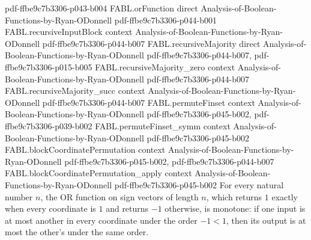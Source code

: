 \begin{theorem}
  {pdf-ffbe9c7b3306-p043-b004}
\proofstep
  {FABL.orFunction}
  {direct}
  {Analysis-of-Boolean-Functions-by-Ryan-ODonnell}
  {pdf-ffbe9c7b3306-p044-b001}
\proofstep
  {FABL.recursiveInputBlock}
  {context}
  {Analysis-of-Boolean-Functions-by-Ryan-ODonnell}
  {pdf-ffbe9c7b3306-p044-b007}
\proofstep
  {FABL.recursiveMajority}
  {direct}
  {Analysis-of-Boolean-Functions-by-Ryan-ODonnell}
  {pdf-ffbe9c7b3306-p044-b007,
    pdf-ffbe9c7b3306-p015-b005}
\proofstep
  {FABL.recursiveMajority_zero}
  {context}
  {Analysis-of-Boolean-Functions-by-Ryan-ODonnell}
  {pdf-ffbe9c7b3306-p044-b007}
\proofstep
  {FABL.recursiveMajority_succ}
  {context}
  {Analysis-of-Boolean-Functions-by-Ryan-ODonnell}
  {pdf-ffbe9c7b3306-p044-b007}
\proofstep
  {FABL.permuteFinset}
  {context}
  {Analysis-of-Boolean-Functions-by-Ryan-ODonnell}
  {pdf-ffbe9c7b3306-p045-b002,
    pdf-ffbe9c7b3306-p039-b002}
\proofstep
  {FABL.permuteFinset_symm}
  {context}
  {Analysis-of-Boolean-Functions-by-Ryan-ODonnell}
  {pdf-ffbe9c7b3306-p045-b002}
\proofstep
  {FABL.blockCoordinatePermutation}
  {context}
  {Analysis-of-Boolean-Functions-by-Ryan-ODonnell}
  {pdf-ffbe9c7b3306-p045-b002,
    pdf-ffbe9c7b3306-p044-b007}
\proofstep
  {FABL.blockCoordinatePermutation_apply}
  {context}
  {Analysis-of-Boolean-Functions-by-Ryan-ODonnell}
  {pdf-ffbe9c7b3306-p045-b002}
For every natural number $n$, the OR function on sign vectors of length $n$, which
returns $1$ exactly when every coordinate is $1$ and returns $-1$ otherwise, is
monotone: if one input is at most another in every coordinate under the order $-1<1$,
then its output is at most the other's under the same order.
\end{theorem}

